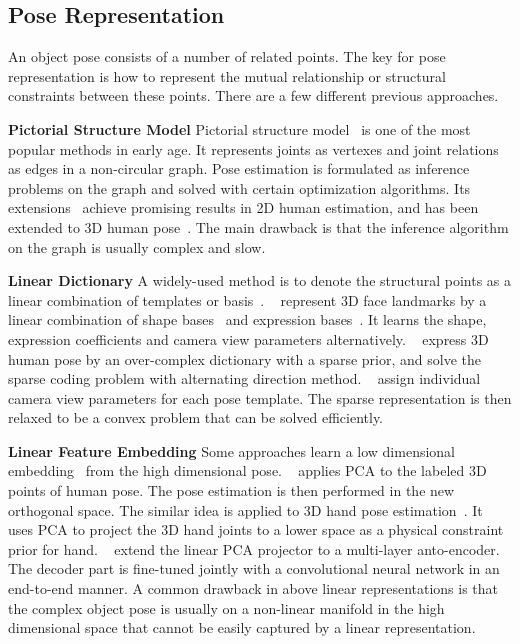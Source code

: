 \documentclass[runningheads]{llncs}
\begin{document}
\subsection{Pose Representation}
An object pose consists of a number of related points. The key for pose representation is how to represent the mutual relationship or structural constraints between these points. There are a few different previous approaches.

\textbf{Pictorial Structure Model}
Pictorial structure model~\cite{felzenszwalb2005pictorial} is one of the most popular methods in early age. It represents joints as vertexes and joint relations as edges in a non-circular graph. Pose estimation is formulated as inference problems on the graph and solved with certain optimization algorithms. Its extensions~\cite{johnson2011learning,yang2011articulated,Pishchulin_2013_CVPR} achieve promising results in 2D human estimation, and has been extended to 3D human pose~\cite{Belagiannis_2014_CVPR}. The main drawback is that the inference algorithm on the graph is usually complex and slow.

\textbf{Linear Dictionary}
A widely-used method is to denote the structural points as a linear combination of templates or basis~\cite{Wang_2014_CVPR,Zhou_2015_CVPR,Zhou_2016_CVPR,Jourabloo_2016_CVPR}. ~\cite{Jourabloo_2016_CVPR} represent 3D face landmarks by a linear combination of shape bases~\cite{paysan20093d} and expression bases~\cite{cao2014facewarehouse}. It learns the shape, expression coefficients and camera view parameters alternatively. ~\cite{Wang_2014_CVPR} express 3D human pose by an over-complex dictionary with a sparse prior, and solve the sparse coding problem with alternating direction method. ~\cite{Zhou_2015_CVPR} assign individual camera view parameters for each pose template. The sparse representation is then relaxed to be a convex problem that can be solved efficiently.

\textbf{Linear Feature Embedding}
Some approaches learn a low dimensional embedding~\cite{ionescu2014human3,oberweger2015hands,h36m_pami,tekin2016structured} from the high dimensional pose. ~\cite{ionescu2014human3} applies PCA to the labeled 3D points of human pose. The pose estimation is then performed in the new orthogonal space. The similar idea is applied to 3D hand pose estimation~\cite{oberweger2015hands}. It uses PCA to project the 3D hand joints to a lower space as a physical constraint prior for hand. ~\cite{tekin2016structured} extend the linear PCA projector to a multi-layer anto-encoder. The decoder part is fine-tuned jointly with a convolutional neural network in an end-to-end manner. A common drawback in above linear representations is that the complex object pose is usually on a non-linear manifold in the high dimensional space that cannot be easily captured by a linear representation.
\end{document}
